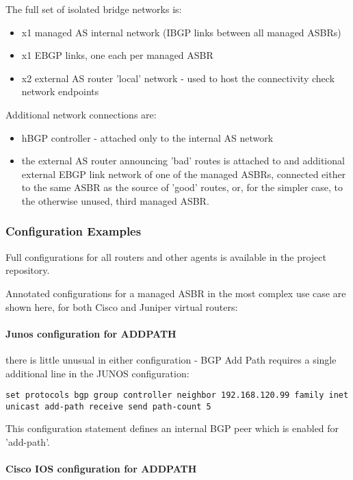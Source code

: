 The full set of isolated bridge networks is:
\begin{itemize}
    \item x1 managed AS internal network (IBGP links between all managed ASBRs)
    \item x1 EBGP links, one each per managed ASBR
    \item x2 external AS router 'local' network - used to host the connectivity check network endpoints
\end{itemize}

Additional network connections are:
\begin{itemize}
    \item hBGP controller - attached only to the internal AS network
    \item the external AS router announcing 'bad' routes is attached to and additional external EBGP link network of one of the managed ASBRs, connected either to the same ASBR as the source of 'good' routes, or, for the simpler case, to the otherwise unused, third managed ASBR.
\end{itemize}

\subsubsection{Configuration Examples}

Full configurations for all routers and other agents is available in the project repository.

Annotated configurations for a managed ASBR in the most complex use case are shown here, for both Cisco and Juniper virtual routers:

\paragraph{Junos configuration for ADDPATH}
there is little unusual in either configuration - BGP Add Path requires a single additional line in the JUNOS configuration:

\begin{verbatim}
set protocols bgp group controller neighbor 192.168.120.99 family inet unicast add-path receive send path-count 5
\end{verbatim}
This configuration statement defines an internal BGP peer which is enabled for 'add-path'.

\paragraph{Cisco IOS configuration for ADDPATH}

